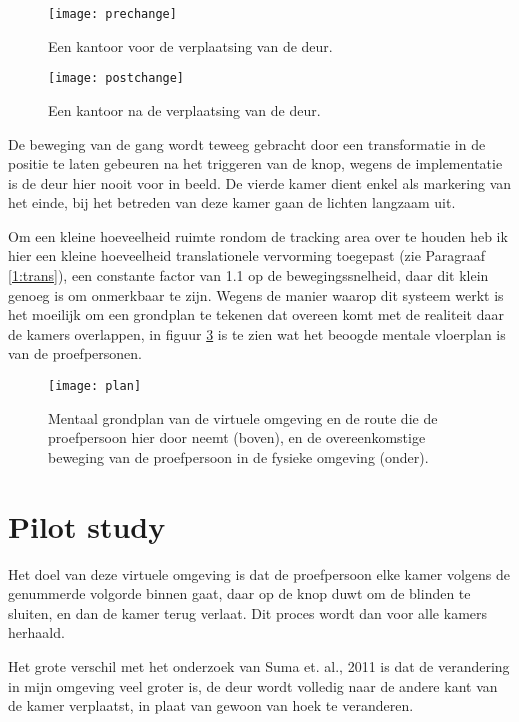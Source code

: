 \begin{figure}[t!]
    \centering
    \texttt{[image: prechange]}
    \caption{Een kantoor voor de verplaatsing van de deur.}
    \label{fig:prechange}
\end{figure}

\begin{figure}[t!]
    \centering
    \texttt{[image: postchange]}
    \caption{Een kantoor na de verplaatsing van de deur.}
    \label{fig:postchange}
\end{figure}

De beweging van de gang wordt teweeg gebracht door een transformatie in de
positie te laten gebeuren na het triggeren van de knop, wegens de implementatie
is de deur hier nooit voor in beeld. De vierde kamer dient enkel als markering 
van het einde, bij het betreden van deze kamer gaan de lichten langzaam uit.

Om een kleine hoeveelheid ruimte rondom de tracking area over te houden heb ik
hier een kleine hoeveelheid translationele vervorming toegepast (zie Paragraaf 
\ref{1:trans}), een constante factor van 1.1 op de bewegingssnelheid, daar dit 
klein genoeg is om onmerkbaar te zijn\cite{steinicke09}. Wegens de manier waarop 
dit systeem werkt is het moeilijk om een grondplan te tekenen dat overeen komt 
met de realiteit daar de kamers overlappen, in figuur \ref{fig:plan} is te zien 
wat het beoogde mentale vloerplan is van de proefpersonen.

\begin{figure}[t!]
    \centering
    \texttt{[image: plan]}
    \caption{Mentaal grondplan van de virtuele omgeving en de route die de
    proefpersoon hier door neemt (boven), en de overeenkomstige beweging van de
    proefpersoon in de fysieke omgeving (onder).}
    \label{fig:plan}
\end{figure}


\section{Pilot study}
Het doel van deze virtuele omgeving is dat de proefpersoon elke kamer volgens de
genummerde volgorde binnen gaat, daar op de knop duwt om de blinden te sluiten,
en dan de kamer terug verlaat. Dit proces wordt dan voor alle kamers herhaald.

Het grote verschil met het onderzoek van Suma et. al., 2011 \cite{suma11} is dat
de verandering in mijn omgeving veel groter is, de deur wordt volledig naar de
andere kant van de kamer verplaatst, in plaat van gewoon van hoek te veranderen. 

